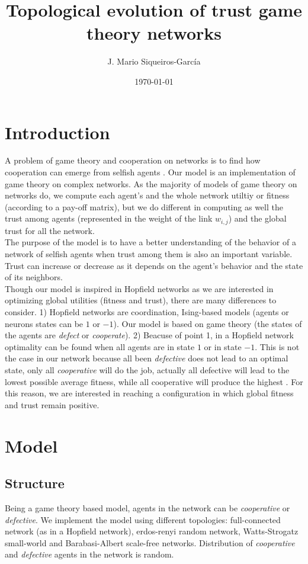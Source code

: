 \documentclass[11pt]{article}
\author{J. Mario Siqueiros-Garc\'ia}
\title{Topological evolution of trust game theory networks}
\date{\today}
\begin{document}
\maketitle

\section{Introduction}

A problem of game theory and cooperation on networks is to find how cooperation can emerge from selfish agents \cite{nowak2006}. Our model is an implementation of game theory on complex networks. As the majority of models of game theory on networks do, we compute each agent's and the whole network utiltiy or fitness (according to a pay-off matrix), but we do different in computing as well the trust among agents (represented in the weight of the link $w_{i,j}$) and the global trust for all the network.\\

The purpose of the model is to have a better understanding of the behavior of a network of selfish agents when trust among them is also an important variable. Trust can increase or decrease as it depends on the agent's behavior and the state of its neighbors.\\

Though our model is inspired in Hopfield networks as we are interested in optimizing global utilities (fitness and trust), there are many differences to consider. 1) Hopfield networks are coordination, Ising-based models (agents or neurons states can be $1$ or $-1$). Our model is based on game theory (the states of the agents are \textit{defect} or \textit{cooperate}). 2) Beacuse of point 1, in a Hopfield network optimality can be found when all agents are in state $1$ or in state $-1$. This is not the case in our network because all been \textit{defective} does not lead to an optimal state, only all \textit{cooperative} will do the job, actually all defective will lead to the lowest possible average fitness, while all cooperative will produce the highest \cite{nowak2006}. For this reason, we are interested in reaching a configuration in which global fitness and trust remain positive. \\

\section{Model}

\subsection{Structure}
Being a game theory based model, agents in the network can be \textit{cooperative} or \textit{defective}. We implement the model using different topologies: full-connected network (as in a Hopfield network), erdos-renyi random network, Watts-Strogatz small-world and Barabasi-Albert scale-free networks. Distribution of \textit{cooperative} and \textit{defective} agents in the network is random.\\
\end{document}
